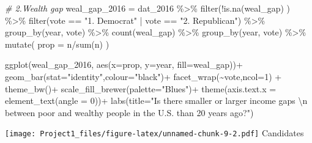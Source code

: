 \documentclass[
]{article}
\newenvironment{Shaded}{\begin{snugshade}}{\end{snugshade}}
\newcommand{\AttributeTok}[1]{\textcolor[rgb]{0.77,0.63,0.00}{#1}}
\newcommand{\CommentTok}[1]{\textcolor[rgb]{0.56,0.35,0.01}{\textit{#1}}}
\newcommand{\DecValTok}[1]{\textcolor[rgb]{0.00,0.00,0.81}{#1}}
\newcommand{\FunctionTok}[1]{\textcolor[rgb]{0.00,0.00,0.00}{#1}}
\newcommand{\NormalTok}[1]{#1}
\newcommand{\OtherTok}[1]{\textcolor[rgb]{0.56,0.35,0.01}{#1}}
\newcommand{\SpecialCharTok}[1]{\textcolor[rgb]{0.00,0.00,0.00}{#1}}
\newcommand{\StringTok}[1]{\textcolor[rgb]{0.31,0.60,0.02}{#1}}
\begin{document}
\begin{Shaded}
\begin{Highlighting}[]
\CommentTok{\# 2.Wealth gap}
\NormalTok{weal\_gap\_2016 }\OtherTok{=}\NormalTok{ dat\_2016 }\SpecialCharTok{\%\textgreater{}\%}
  \FunctionTok{filter}\NormalTok{(}\SpecialCharTok{!}\FunctionTok{is.na}\NormalTok{(weal\_gap) ) }\SpecialCharTok{\%\textgreater{}\%}
  \FunctionTok{filter}\NormalTok{(vote }\SpecialCharTok{==} \StringTok{"1. Democrat"} \SpecialCharTok{|}\NormalTok{ vote }\SpecialCharTok{==} \StringTok{"2. Republican"}\NormalTok{) }\SpecialCharTok{\%\textgreater{}\%}
  \FunctionTok{group\_by}\NormalTok{(year, vote) }\SpecialCharTok{\%\textgreater{}\%}
  \FunctionTok{count}\NormalTok{(weal\_gap) }\SpecialCharTok{\%\textgreater{}\%}
  \FunctionTok{group\_by}\NormalTok{(year, vote) }\SpecialCharTok{\%\textgreater{}\%}
  \FunctionTok{mutate}\NormalTok{(}
    \AttributeTok{prop =}\NormalTok{ n}\SpecialCharTok{/}\FunctionTok{sum}\NormalTok{(n)}
\NormalTok{  )}

\FunctionTok{ggplot}\NormalTok{(weal\_gap\_2016,}
       \FunctionTok{aes}\NormalTok{(}\AttributeTok{x=}\NormalTok{prop, }\AttributeTok{y=}\NormalTok{year, }\AttributeTok{fill=}\NormalTok{weal\_gap))}\SpecialCharTok{+}
  \FunctionTok{geom\_bar}\NormalTok{(}\AttributeTok{stat=}\StringTok{"identity"}\NormalTok{,}\AttributeTok{colour=}\StringTok{"black"}\NormalTok{)}\SpecialCharTok{+}
  \FunctionTok{facet\_wrap}\NormalTok{(}\SpecialCharTok{\textasciitilde{}}\NormalTok{vote,}\AttributeTok{ncol=}\DecValTok{1}\NormalTok{) }\SpecialCharTok{+}
  \FunctionTok{theme\_bw}\NormalTok{()}\SpecialCharTok{+}
  \FunctionTok{scale\_fill\_brewer}\NormalTok{(}\AttributeTok{palette=}\StringTok{"Blues"}\NormalTok{)}\SpecialCharTok{+}
  \FunctionTok{theme}\NormalTok{(}\AttributeTok{axis.text.x =} \FunctionTok{element\_text}\NormalTok{(}\AttributeTok{angle =} \DecValTok{0}\NormalTok{))}\SpecialCharTok{+}
  \FunctionTok{labs}\NormalTok{(}\AttributeTok{title=}\StringTok{"Is there smaller or larger income gaps }\SpecialCharTok{\textbackslash{}n}\StringTok{ between poor and wealthy people in the U.S. than 20 years ago?"}\NormalTok{)}
\end{Highlighting}
\end{Shaded}

\texttt{[image: Project1\_files/figure-latex/unnamed-chunk-9-2.pdf]}
Candidates
\end{document}
